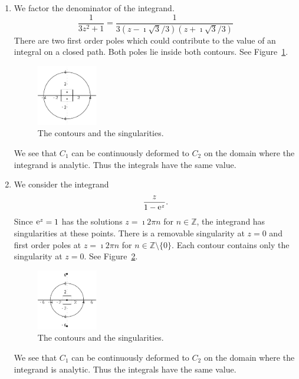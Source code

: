 {\begin{Solution}
  \begin{enumerate}
  \item 
    We factor the denominator of the integrand.
    \[
    \frac{1}{3 z^2 + 1} = \frac{1}{3 (z - \imath \sqrt{3}/3) (z + \imath \sqrt{3}/3)}
    \]
    There are two first order poles which could contribute to the value of an 
    integral on a closed path.  Both poles lie inside both contours.  
    See Figure~\ref{figure 13z21}.
    \begin{figure}[htb!]
      \begin{center}
        \includegraphics[width=0.25\textwidth]{fcv/cauchy/13z21}
      \end{center}
      \caption{The contours and the singularities.}
      \label{figure 13z21}
    \end{figure}
    We see that $C_1$ can be continuously deformed to $C_2$ on the domain where 
    the integrand is analytic.  Thus the integrals have the same value.
  \item 
    We consider the integrand
    \[
    \frac{z}{1 - \mathop{\mathrm{e}}\nolimits^z}.
    \]
    Since $\mathop{\mathrm{e}}\nolimits^z = 1$ has the solutions $z = \imath 2 \pi n$ for $n \in \mathbb{Z}$,
    the integrand has singularities at these points.
    There is a removable singularity at $z = 0$ and first order poles at 
    $z = \imath 2 \pi n$ for $n \in \mathbb{Z} \setminus \{ 0 \}$.
    Each contour contains only the singularity at $z = 0$. 
    See Figure~\ref{figure z1ez}.
    \begin{figure}[htb!]
      \begin{center}
        \includegraphics[width=0.25\textwidth]{fcv/cauchy/z1ez}
      \end{center}
      \caption{The contours and the singularities.}
      \label{figure z1ez}
    \end{figure}
    We see that $C_1$ can be continuously deformed to $C_2$ on the domain where 
    the integrand is analytic.  Thus the integrals have the same value.
  \end{enumerate}
\end{Solution}










}
